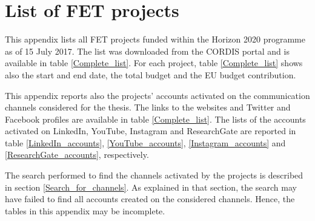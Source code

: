 \chapter{List of FET projects} \label{List_of_FET_projects}
This appendix lists all FET projects funded within the Horizon 2020 programme as of 15 July 2017. The list was downloaded from the CORDIS portal \cite{CORDIS} and is available in table \ref{Complete_list}. For each project, table \ref{Complete_list} shows also the start and end date, the total budget and the EU budget contribution.  

This appendix reports also the projects' accounts activated on the communication channels considered for the thesis. The links to the websites and Twitter and Facebook profiles are available in table \ref{Complete_list}. The lists of the accounts activated on LinkedIn, YouTube, Instagram and ResearchGate are reported in table \ref{LinkedIn_accounts}, \ref{YouTube_accounts}, \ref{Instagram_accounts} and \ref{ResearchGate_accounts}, respectively.

The search performed to find the channels activated by the projects is described in section \ref{Search_for_channels}. As explained in that section, the search may have failed to find all accounts created on the considered channels. Hence, the tables in this appendix may be incomplete.

